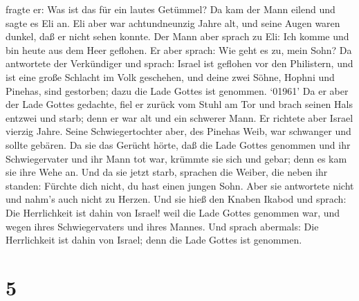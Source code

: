 fragte er: Was ist das für ein lautes Getümmel? Da kam der Mann eilend
und sagte es Eli an.  Eli aber war achtundneunzig Jahre
alt, und seine Augen waren dunkel, daß er nicht sehen konnte.
 Der Mann aber sprach zu Eli: Ich komme und bin heute aus
dem Heer geflohen. Er aber sprach: Wie geht es zu, mein Sohn?
 Da antwortete der Verkündiger und sprach: Israel ist
geflohen vor den Philistern, und ist eine große Schlacht im Volk
geschehen, und deine zwei Söhne, Hophni und Pinehas, sind gestorben;
dazu die Lade Gottes ist genommen.  `01961' Da er aber der
Lade Gottes gedachte, fiel er zurück vom Stuhl am Tor und brach seinen
Hals entzwei und starb; denn er war alt und ein schwerer Mann. Er
richtete aber Israel vierzig Jahre.  Seine Schwiegertochter
aber, des Pinehas Weib, war schwanger und sollte gebären. Da sie das
Gerücht hörte, daß die Lade Gottes genommen und ihr Schwiegervater und
ihr Mann tot war, krümmte sie sich und gebar; denn es kam sie ihre Wehe
an.  Und da sie jetzt starb, sprachen die Weiber, die neben
ihr standen: Fürchte dich nicht, du hast einen jungen Sohn. Aber sie
antwortete nicht und nahm's auch nicht zu Herzen.  Und sie
hieß den Knaben Ikabod und sprach: Die Herrlichkeit ist dahin von
Israel! weil die Lade Gottes genommen war, und wegen ihres
Schwiegervaters und ihres Mannes.  Und sprach abermals: Die
Herrlichkeit ist dahin von Israel; denn die Lade Gottes ist genommen.

\hypertarget{section-4}{%
\section{5}\label{section-4}}

